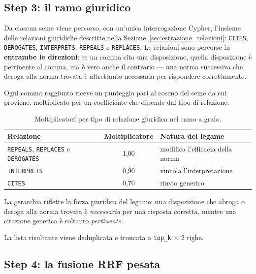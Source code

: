 \subsection{Step 3: il ramo giuridico}

Da ciascun seme viene percorso, con un'unica interrogazione Cypher, l'insieme delle relazioni giuridiche descritte nella Sezione~\ref{sec:estrazione_relazioni}: \texttt{CITES}, \texttt{DEROGATES}, \texttt{INTERPRETS}, \texttt{REPEALS} e \texttt{REPLACES}. Le relazioni sono percorse in \textbf{entrambe le direzioni}: se un comma cita una disposizione, quella disposizione è pertinente al comma, ma è vero anche il contrario --- una norma successiva che deroga alla norma trovata è altrettanto necessaria per rispondere correttamente.

Ogni comma raggiunto riceve un punteggio pari al coseno del seme da cui proviene, moltiplicato per un coefficiente che dipende dal tipo di relazione:

\begin{table}[H]
    \centering
    \renewcommand{\arraystretch}{1.2}
    \begin{tabular}{|l|c|l|}
        \hline
        \textbf{Relazione} & \textbf{Moltiplicatore} & \textbf{Natura del legame} \\
        \hline
        \texttt{REPEALS}, \texttt{REPLACES} e \texttt{DEROGATES} & 1,00 & modifica l'efficacia della norma \\
        \texttt{INTERPRETS} & 0,90 & vincola l'interpretazione \\
        \texttt{CITES} & 0,70 & rinvio generico \\
        \hline
    \end{tabular}
    \caption{Moltiplicatori per tipo di relazione giuridica nel ramo a grafo.}
    \label{tab:moltiplicatori_relazione}
\end{table}

La gerarchia riflette la forza giuridica del legame: una disposizione che abroga o deroga alla norma trovata è \textit{necessaria} per una risposta corretta, mentre una citazione generica è soltanto \textit{pertinente}.

La lista risultante viene deduplicata e troncata a \texttt{top\_k} $\times$ 2 righe.


\subsection{Step 4: la fusione RRF pesata}
\label{sec:aritmetica_fusione}

